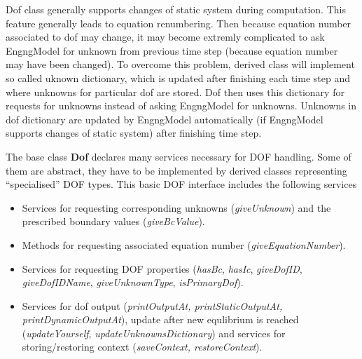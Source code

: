 \documentclass[a4paper]{article}
\newcommand{\class}[1]{{\bf #1}}
\newcommand{\service}[1]{{\em #1}}
\begin{document}
Dof class generally supports changes of static system during computation.
This feature generally leads to equation renumbering. Then because equation number
associated to dof may change, it may become extremly complicated to ask EngngModel
for unknown from previous time step (because equation number may have been changed).
To overcome this problem, derived class will implement so called uknown dictionary,
which is updated after finishing each time step and where unknowns for particular
dof are stored. Dof then uses this dictionary for requests for unknowns instead of 
asking EngngModel for unknowns. Unknowns in dof dictionary are updated by EngngModel
automatically (if EngngModel supports changes of static system) after finishing time
step. 

The base class \class{Dof} declares many services necessary for DOF
handling. Some of them are abstract, they have to be implemented by
derived classes representing ``specialised'' DOF types.
This basic DOF interface includes the following services
\begin{itemize}
\item
Services for requesting corresponding unknowns (\service{giveUnknown})
and the prescribed boundary values (\service{giveBcValue}).
\item
Methods for requesting associated equation number
(\service{giveEquationNumber}).
\item
Services for requesting DOF properties (\service{hasBc},
\service{hasIc}, \service{giveDofID}, \service{giveDofIDName},
\service{giveUnknownType}, \service{isPrimaryDof}).
\item
Services for dof output (\service{printOutputAt, printStaticOutputAt,
printDynamicOutputAt}), update after new equlibrium is reached
(\service{updateYourself}, \service{updateUnknownsDictionary}) and
services for storing/restoring context (\service{saveContext, restoreContext}).
\end{itemize}
\end{document}
